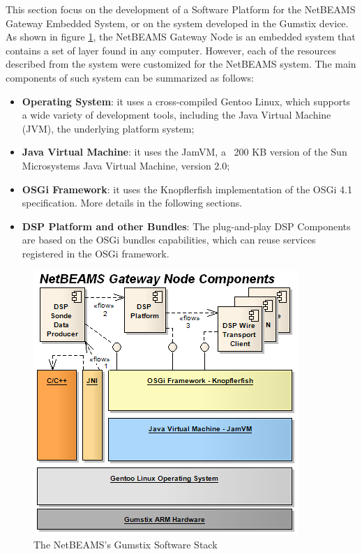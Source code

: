 This section focus on the development of a Software Platform for the NetBEAMS
Gateway Embedded System, or on the system developed in the Gumstix device. As
shown in figure \ref{fig:netbeams-software-stack}, the NetBEAMS Gateway Node is
an embedded system that contains a set of layer found in any computer.
However, each of the resources described from the system were customized for
the NetBEAMS system. The main components of such system can be summarized as
follows:

\begin{itemize}
  \item \textbf{Operating System}: it uses a cross-compiled Gentoo Linux, which
  supports a wide variety of development tools, including the Java Virtual Machine
  (JVM), the underlying platform system;
  \item \textbf{Java Virtual Machine}: it uses the JamVM, a ~200 KB version of
  the Sun Microsystems Java Virtual Machine, version 2.0;
  \item \textbf{OSGi Framework}: it uses the Knopflerfish implementation of the
  OSGi 4.1 specification. More details in the following sections.
  \item \textbf{DSP Platform and other Bundles}: The plug-and-play DSP
  Components are based on the OSGi bundles capabilities, which can reuse services registered in the OSGi framework.
\end{itemize}

\begin{figure}[h]
  \centering
  \includegraphics[scale=0.6]{../diagrams/NetBEAMS-Client-Node-Components}
  \caption{The NetBEAMS's Gumstix Software Stack}
  \label{fig:netbeams-software-stack}
\end{figure}


